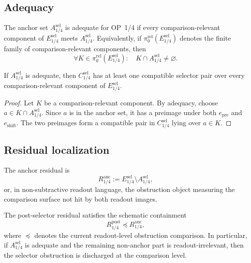 \subsection{Adequacy}
\label{subsec:v410r08-adequacy}

\begin{definition}
\label{def:v410r08-anchor-adequacy}
The anchor set \(A_{1/4}^{\mathrm{sel}}\) is adequate for OP~1/4 if every
comparison-relevant component of \(E_{1/4}^{\mathrm{sel}}\) meets
\(A_{1/4}^{\mathrm{sel}}\). Equivalently, if
\(\pi_0^{\mathrm{rel}}(E_{1/4}^{\mathrm{sel}})\) denotes the finite family of
comparison-relevant components, then
\[
 \forall K\in\pi_0^{\mathrm{rel}}(E_{1/4}^{\mathrm{sel}}):
 \quad
 K\cap A_{1/4}^{\mathrm{sel}}\neq\varnothing.
\]
\end{definition}

\begin{lemma}
\label{lem:v410r08-adequacy-transfers-to-selector-coverage}
If \(A_{1/4}^{\mathrm{sel}}\) is adequate, then
\(C_{1/4}^{\mathrm{sel}}\) has at least one compatible selector pair over every
comparison-relevant component of \(E_{1/4}^{\mathrm{sel}}\).
\end{lemma}

\begin{proof}
Let \(K\) be a comparison-relevant component. By adequacy, choose
\(a\in K\cap A_{1/4}^{\mathrm{sel}}\). Since \(a\) is in the anchor set, it
has a preimage under both \(e_{\mathrm{pre}}\) and \(e_{\mathrm{shift}}\). The two
preimages form a compatible pair in \(C_{1/4}^{\mathrm{sel}}\) lying over
\(a\in K\).
\end{proof}

\subsection{Residual localization}
\label{subsec:v410r08-residual-localization}

\begin{definition}
\label{def:v410r08-anchor-residual}
The anchor residual is
\[
 R_{1/4}^{\mathrm{anc}}
 :=
 E_{1/4}^{\mathrm{sel}}
 \setminus
 A_{1/4}^{\mathrm{sel}},
\]
or, in non-subtractive readout language, the obstruction object measuring the
comparison surface not hit by both readout images.
\end{definition}

\begin{proposition}
\label{prop:v410r08-post-selector-controlled-by-anchor-residual}
The post-selector residual satisfies the schematic containment
\[
 R_{1/4}^{\mathrm{post}}
 \preceq
 R_{1/4}^{\mathrm{anc}},
\]
where \(\preceq\) denotes the current readout-level obstruction comparison.
In particular, if \(A_{1/4}^{\mathrm{sel}}\) is adequate and the remaining
non-anchor part is readout-irrelevant, then the selector obstruction is
discharged at the comparison level.
\end{proposition}

